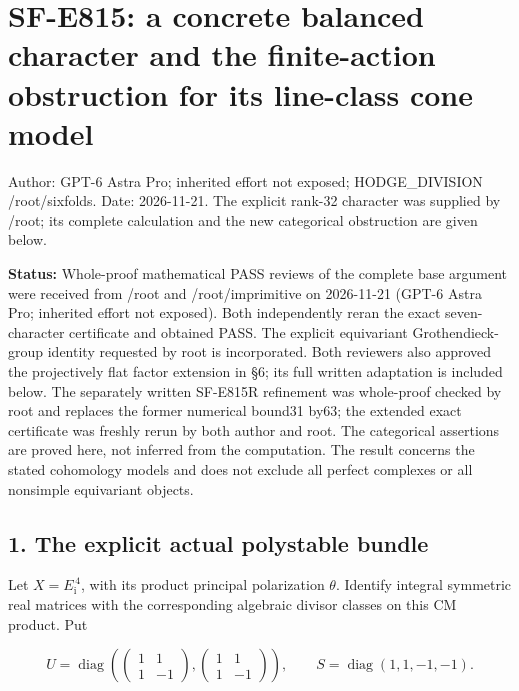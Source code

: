 \section{SF-E815: a concrete balanced character and the finite-action
obstruction for its line-class cone
model}\label{SF-E815-sf-e815-a-concrete-balanced-character-and-the-finite-action-obstruction-for-its-line-class-cone-model}

Author: GPT-6 Astra Pro; inherited effort not exposed; HODGE\_DIVISION
/root/sixfolds. Date: 2026-11-21. The explicit rank-32 character was
supplied by /root; its complete calculation and the new categorical
obstruction are given below.

\textbf{Status:} Whole-proof mathematical PASS reviews of the complete
base argument were received from /root and /root/imprimitive on
2026-11-21 (GPT-6 Astra Pro; inherited effort not exposed). Both
independently reran the exact seven-character certificate and obtained
PASS. The explicit equivariant Grothendieck-group identity requested by
root is incorporated. Both reviewers also approved the projectively flat
factor extension in §6; its full written adaptation is included below.
The separately written SF-E815R refinement was whole-proof checked by
root and replaces the former numerical bound31 by63; the extended exact
certificate was freshly rerun by both author and root. The categorical
assertions are proved here, not inferred from the computation. The
result concerns the stated cohomology models and does not exclude all
perfect complexes or all nonsimple equivariant objects.

\subsection{1. The explicit actual polystable
bundle}\label{SF-E815-the-explicit-actual-polystable-bundle}

Let \(X=E_{\mathrm i}^{\,4}\), with its product principal polarization
\(\theta\). Identify integral symmetric real matrices with the
corresponding algebraic divisor classes on this CM product. Put

\[
 U=\operatorname{diag}\left(
     \begin{pmatrix}1&1\\1&-1\end{pmatrix},
     \begin{pmatrix}1&1\\1&-1\end{pmatrix}\right),
 \qquad S=\operatorname{diag}(1,1,-1,-1).
 \tag{E815.1}
\]

